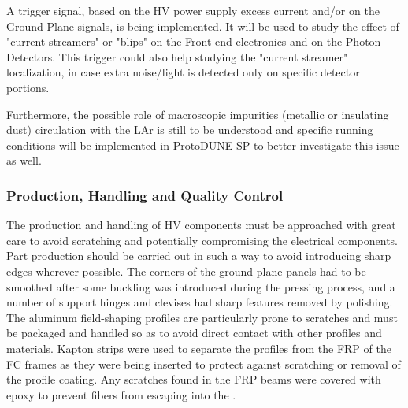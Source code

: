 A trigger signal, based on the HV power supply excess current and/or on the Ground Plane signals, is being implemented.  It will be used to study the effect of "current streamers" or "blips"  on the Front end electronics and on the Photon Detectors. This trigger could also help studying the "current streamer" localization, in case extra noise/light is detected only on specific detector portions.

Furthermore, the possible role of macroscopic impurities (metallic or insulating dust) circulation with the LAr is still to be understood and specific running conditions will be implemented in ProtoDUNE SP to better investigate this issue as well. 




\subsubsection{Production, Handling and Quality Control}
\label{sec:fdsp-hv-protodune-lessons-prod}

The production and handling of HV components must be approached with %
great care to avoid scratching and potentially compromising the electrical components. %
Part production should be carried out in such a way to avoid introducing sharp edges wherever possible.
The corners of the ground plane panels had to be smoothed after some buckling was introduced during the pressing process, and a number of support hinges and clevises had sharp features removed by polishing.
The aluminum field-shaping profiles are particularly prone to scratches and must be packaged and handled so as to avoid direct contact with other profiles and materials.
Kapton strips were used to separate the profiles from the FRP of the FC frames as they were being inserted to protect against scratching or removal of the profile coating.
Any scratches found in the FRP beams were covered with epoxy to prevent fibers from escaping into the .

